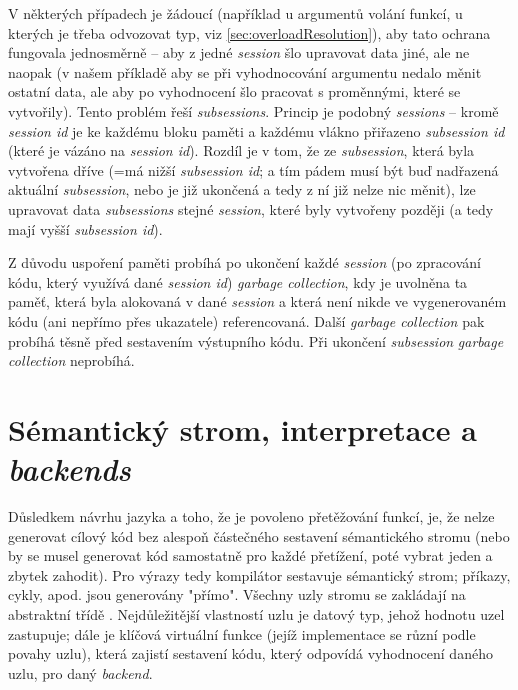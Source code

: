 V některých případech je žádoucí (například u argumentů volání funkcí, u kterých je třeba odvozovat typ, viz \autoref{sec:overloadResolution}), aby tato ochrana fungovala jednosměrně -- aby z jedné \textit{session} šlo upravovat data jiné, ale ne naopak (v našem příkladě aby se při vyhodnocování argumentu nedalo měnit ostatní data, ale aby po vyhodnocení šlo pracovat s proměnnými, které se vytvořily). Tento problém řeší \textit{subsessions}. Princip je podobný \textit{sessions} -- kromě \textit{session id} je ke každému bloku paměti a každému vlákno přiřazeno \textit{subsession id} (které je vázáno na \textit{session id}). Rozdíl je v tom, že ze \textit{subsession}, která byla vytvořena dříve (=má nižší \textit{subsession id}; a tím pádem musí být buď nadřazená aktuální \textit{subsession}, nebo je již ukončená a tedy z ní již nelze nic měnit), lze upravovat data \textit{subsessions} stejné \textit{session}, které byly vytvořeny později (a tedy mají vyšší \textit{subsession id}).


Z důvodu uspoření paměti probíhá po ukončení každé \textit{session} (po zpracování kódu, který využívá dané \textit{session id}) \textit{garbage collection}, kdy je uvolněna ta paměť, která byla alokovaná v dané \textit{session} a která není nikde ve vygenerovaném kódu (ani nepřímo přes ukazatele) referencovaná. Další \textit{garbage collection} pak probíhá těsně před sestavením výstupního kódu. Při ukončení \textit{subsession} \textit{garbage collection} neprobíhá.

\section{Sémantický strom, interpretace a \textit{backends}} \label{impl:backends}
Důsledkem návrhu jazyka a toho, že je povoleno přetěžování funkcí, je, že nelze generovat cílový kód bez alespoň částečného sestavení sémantického stromu (nebo by se musel generovat kód samostatně pro každé přetížení, poté vybrat jeden a zbytek zahodit). Pro výrazy tedy kompilátor sestavuje sémantický strom; příkazy, cykly, apod. jsou generovány "přímo". Všechny uzly stromu se zakládají na abstraktní třídě . Nejdůležitější vlastností uzlu je datový typ, jehož hodnotu uzel zastupuje; dále je klíčová virtuální funkce  (jejíž implementace se různí podle povahy uzlu), která zajistí sestavení kódu, který odpovídá vyhodnocení daného uzlu, pro daný \textit{backend}.

